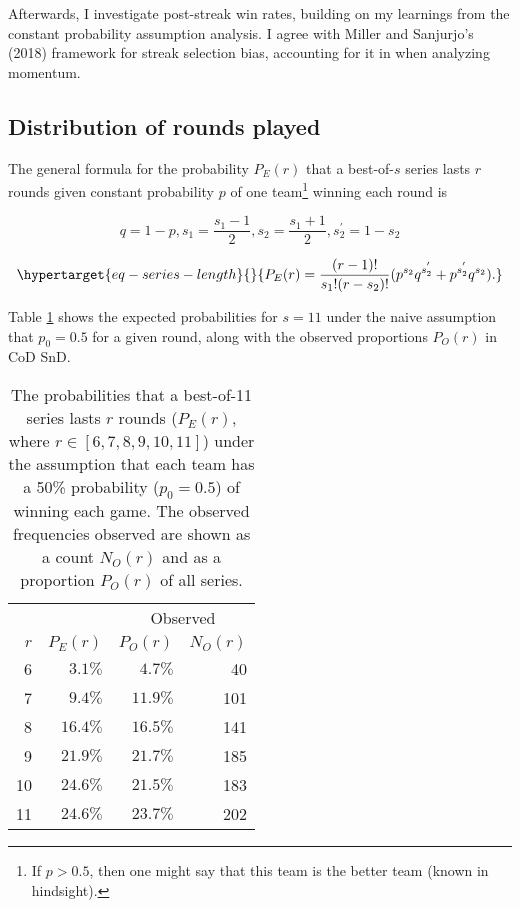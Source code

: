\documentclass{article}
\begin{document}
Afterwards, I investigate post-streak win rates, building on my
learnings from the constant probability assumption analysis. I agree
with Miller and Sanjurjo's (2018) framework for streak selection bias,
accounting for it in when analyzing momentum.

\hypertarget{sec:analysis-1}{%
\subsection{Distribution of rounds played}\label{sec:analysis-1}}

The general formula for the probability \(P_E(r)\) that a best-of-\(s\)
series lasts \(r\) rounds given constant probability \(p\) of one
team\footnote{If \(p > 0.5\), then one might say that this team is the
  better team (known in hindsight).} winning each round is

\[
q = 1 - p, s_1 = \frac{s_1 - 1}{2}, s_2 = \frac{s_1 + 1}{2}, s_2^{'} = 1 - s_2
\]

\begin{equation}\protect\hypertarget{eq-series-length}{}{
P_E(r) = \frac{(r - 1)!}{s_1!(r - s_2)!}(p^{s_2}q^{s_2^{'}} + p^{s_2^{'}}q^{s_2}).
}\label{eq:series-length}\end{equation}

Table \ref{tbl:cod-prob-series-lasting-r-rounds} shows the expected
probabilities for \(s = 11\) under the naive assumption that
\(p_0 = 0.5\) for a given round, along with the observed proportions
\(P_O(r)\) in CoD SnD.

\begin{longtable}{rrrr}
\caption{The probabilities that a best-of-11 series lasts $r$ rounds ($P_E(r)$, where $r \in [6, 7, 8, 9, 10, 11]$) under the assumption that each team has a 50\% probability ($p_0 = 0.5$) of winning each game. The observed frequencies observed are shown as a count $N_O(r)$ and as a proportion $P_O(r)$ of all series.}\label{tbl:cod-prob-series-lasting-r-rounds} \\
\toprule
&  & \multicolumn{2}{c}{Observed} \\ 
\cmidrule(lr){3-4}
$r$ & $P_E(r)$ & $P_O(r)$ & $N_O(r)$ \\ 
\midrule
6 & $3.1\%$ & $4.7\%$ & 40 \\ 
7 & $9.4\%$ & $11.9\%$ & 101 \\ 
8 & $16.4\%$ & $16.5\%$ & 141 \\ 
9 & $21.9\%$ & $21.7\%$ & 185 \\ 
10 & $24.6\%$ & $21.5\%$ & 183 \\ 
11 & $24.6\%$ & $23.7\%$ & 202 \\ 
\bottomrule
\end{longtable}
\end{document}

